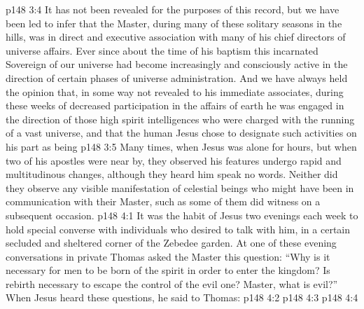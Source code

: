 \vs p148 3:4 It has not been revealed for the purposes of this record, but we have been led to infer that the Master, during many of these solitary seasons in the hills, was in direct and executive association with many of his chief directors of universe affairs. Ever since about the time of his baptism this incarnated Sovereign of our universe had become increasingly and consciously active in the direction of certain phases of universe administration. And we have always held the opinion that, in some way not revealed to his immediate associates, during these weeks of decreased participation in the affairs of earth he was engaged in the direction of those high spirit intelligences who were charged with the running of a vast universe, and that the human Jesus chose to designate such activities on his part as being 
\vs p148 3:5 Many times, when Jesus was alone for hours, but when two of his apostles were near by, they observed his features undergo rapid and multitudinous changes, although they heard him speak no words. Neither did they observe any visible manifestation of celestial beings who might have been in communication with their Master, such as some of them did witness on a subsequent occasion.
\vs p148 4:1 It was the habit of Jesus two evenings each week to hold special converse with individuals who desired to talk with him, in a certain secluded and sheltered corner of the Zebedee garden. At one of these evening conversations in private Thomas asked the Master this question: “Why is it necessary for men to be born of the spirit in order to enter the kingdom? Is rebirth necessary to escape the control of the evil one? Master, what is evil?” When Jesus heard these questions, he said to Thomas:
\vs p148 4:2 \pc {}
\vs p148 4:3 
\vs p148 4:4 
